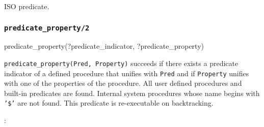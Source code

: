 \begin{PlErrors}






\end{PlErrors}

\Portability

ISO predicate.

\subsubsection{\texttt{predicate\_property/2}}
\label{predicate-property/2}

\begin{TemplatesOneCol}
predicate\_property(?predicate\_indicator, ?predicate\_property)

\end{TemplatesOneCol}

\Description

\texttt{predicate\_property(Pred, Property)} succeeds if there
exists a predicate indicator of a defined procedure that unifies with
\texttt{Pred} and if \texttt{Property} unifies with one of the properties of
the procedure. All user defined procedures and built-in predicates are 
found. Internal system procedures whose name begins with \texttt{'\$'}
are not found. This predicate is re-executable on backtracking.

:

